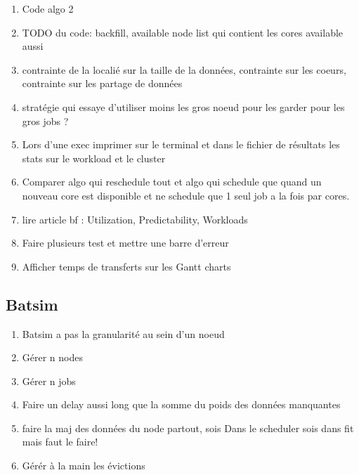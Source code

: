 \documentclass[a4paper]{article}
\begin{document}
\begin{enumerate}
			\item Code algo 2
			\item TODO du code: backfill, available node list qui contient les cores available aussi
			\item contrainte de la localié sur la taille de la données, contrainte sur les coeurs, contrainte sur les partage de données
			\item stratégie qui essaye d'utiliser moins les gros noeud pour les garder pour les gros jobs ?
			\item Lors d'une exec imprimer sur le terminal et dans le fichier de résultats les stats sur le workload et le cluster
			\item Comparer algo qui reschedule tout et algo qui schedule que quand un nouveau core est disponible et ne schedule que 1 seul job a la fois par cores.
			\item lire article bf : Utilization, Predictability, Workloads
			\item Faire plusieurs test et mettre une barre d'erreur
			\item Afficher temps de transferts sur les Gantt charts
		\end{enumerate}
	\subsection{Batsim}
		\begin{enumerate}
			\item Batsim a pas la granularité au sein d'un noeud
			\item Gérer n nodes
			\item Gérer n jobs
			\item Faire un delay aussi long que la somme du poids des données manquantes
			\item faire la maj des données du node partout, sois Dans le scheduler sois dans fit mais faut le faire!
			\item Gérér à la main les évictions
		\end{enumerate}
\end{document}
